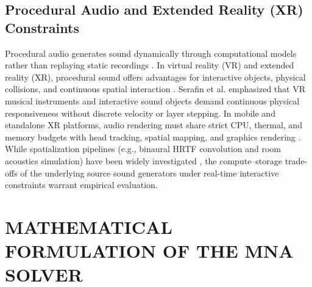 \documentclass[fleqn,final]{jaes}
\begin{document}
\subsection{Procedural Audio and Extended Reality (XR) Constraints}
Procedural audio generates sound dynamically through computational models rather than replaying static recordings \cite{farnell2010designing}. In virtual reality (VR) and extended reality (XR), procedural sound offers advantages for interactive objects, physical collisions, and continuous spatial interaction \cite{serafin2016virtual, turchet2021smart}. Serafin et al. \cite{serafin2016virtual} emphasized that VR musical instruments and interactive sound objects demand continuous physical responsiveness without discrete velocity or layer stepping. In mobile and standalone XR platforms, audio rendering must share strict CPU, thermal, and memory budgets with head tracking, spatial mapping, and graphics rendering \cite{poletti2016spatial, armstrong2020audio}. While spatialization pipelines (e.g., binaural HRTF convolution and room acoustics simulation) have been widely investigated \cite{poletti2016spatial, ziegelwanger2015numerical}, the compute--storage trade-offs of the underlying source sound generators under real-time interactive constraints warrant empirical evaluation.

\section{MATHEMATICAL FORMULATION OF THE MNA SOLVER}
\end{document}
